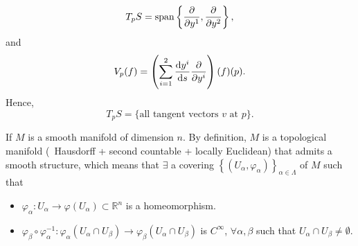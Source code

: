 \begin{enumerate}[(1)]
\begin{itemize}
        \[
            T_p S=\Span \left\{\pdv{y^1},\pdv{y^2}\right\}    
        ,\]
        and 
        \[
            V_p (f)=\left(\sum_{i=1}^2\dv{y^i}{s}\pdv{y^i}\right)(f)(p)    
        .\]
        Hence,
        \[
            T_p S=\{\text{all tangent vectors }v\text{ at }p\}.    
        \]
    \end{itemize}
    \begin{remark}
        If \(M\) is a smooth manifold of dimension \(n\). By definition,
        \(M\) is a topological manifold (\ie\ Hausdorff + second countable 
        + locally Euclidean) that admits a smooth structure, which means 
        that \(\exists\) a covering \(\left\{(U_\alpha,\varphi_\alpha)
        \right\}_{\alpha\in \Lambda}\) of \(M\) such that
        \begin{itemize}
            \item \(\varphi_\alpha\colon U_\alpha\to \varphi
            \left(U_\alpha\right)\subset \mathbb{R}^n\) is a 
            homeomorphism.
            \item \(\varphi_\beta\circ \varphi_\alpha^{-1}\colon
            \varphi_\alpha\left(U_\alpha\cap U_\beta\right)
            \to \varphi_\beta\left(U_\alpha\cap U_\beta\right)
            \)
            is \(C^\infty\), \(\forall\alpha,\beta\) such that 
            \(U_\alpha\cap U_\beta\neq \emptyset\).
        \end{itemize}
        \begin{center}
            



\begin{tikzpicture}[x=0.75pt,y=0.75pt,yscale=-1,xscale=1]


\end{tikzpicture}
\end{center}
\end{remark}
\end{enumerate}
